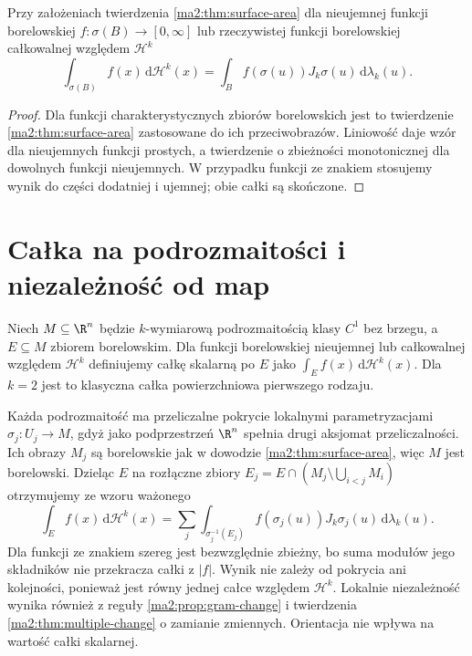 \begin{wniosek}
\label{ma2:cor:surface-weighted-area}
Przy założeniach twierdzenia \ref{ma2:thm:surface-area}
dla nieujemnej funkcji borelowskiej
$f:\sigma(B)\to[0,\infty]$ lub rzeczywistej funkcji
borelowskiej całkowalnej względem $\mathcal H^k$
\[
 \int_{\sigma(B)} f(x)\,\mathrm d\mathcal H^k(x)
 =\int_B f(\sigma(u))J_k\sigma(u)\,\mathrm d\lambda_k(u).
\]
\end{wniosek}
\begin{proof}
Dla funkcji charakterystycznych zbiorów borelowskich
jest to twierdzenie \ref{ma2:thm:surface-area} zastosowane
do ich przeciwobrazów. Liniowość daje wzór dla
nieujemnych funkcji prostych, a twierdzenie o zbieżności
monotonicznej dla dowolnych funkcji nieujemnych.
W przypadku funkcji ze znakiem stosujemy wynik
do części dodatniej i ujemnej; obie całki są skończone.
\end{proof}

\section{Całka na podrozmaitości i niezależność od map}

\begin{definicja}
\label{ma2:def:surface-integral}
Niech $M\subseteq\R^n$ będzie $k$-wymiarową
podrozmaitością klasy $C^1$ bez brzegu,
a $E\subseteq M$ zbiorem borelowskim.
Dla funkcji borelowskiej nieujemnej lub całkowalnej
względem $\mathcal H^k$ definiujemy całkę skalarną
po $E$ jako $\int_E f(x)\,\mathrm d\mathcal H^k(x)$.
Dla $k=2$ jest to klasyczna całka powierzchniowa
pierwszego rodzaju.
\end{definicja}
Każda podrozmaitość ma przeliczalne pokrycie
lokalnymi parametryzacjami $\sigma_j:U_j\to M$,
gdyż jako podprzestrzeń $\R^n$ spełnia drugi
aksjomat przeliczalności. Ich obrazy $M_j$
są borelowskie jak w dowodzie
\ref{ma2:thm:surface-area}, więc $M$ jest borelowski.
Dzieląc $E$ na rozłączne zbiory
$E_j=E\cap(M_j\setminus\bigcup_{i<j}M_i)$
otrzymujemy ze wzoru ważonego
\[
 \int_E f(x)\,\mathrm d\mathcal H^k(x)
 =\sum_j\int_{\sigma_j^{-1}(E_j)}
 f(\sigma_j(u))J_k\sigma_j(u)\,\mathrm d\lambda_k(u).
\]
Dla funkcji ze znakiem szereg jest bezwzględnie
zbieżny, bo suma modułów jego składników
nie przekracza całki z $|f|$.
Wynik nie zależy od pokrycia ani kolejności,
ponieważ jest równy jednej całce względem $\mathcal H^k$.
Lokalnie niezależność wynika również z reguły
\ref{ma2:prop:gram-change} i twierdzenia
\ref{ma2:thm:multiple-change} o zamianie zmiennych.
Orientacja nie wpływa na wartość całki skalarnej.

